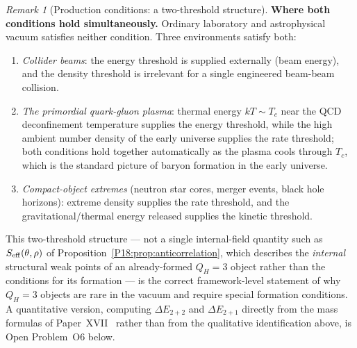 \documentclass[11pt,a4paper]{article}
\theoremstyle{definition}\newtheorem{definition}[theorem]{Definition}
\theoremstyle{remark}
\newtheorem{remark}[theorem]{Remark}
\newcommand{\QH}{Q_H}
\begin{document}
\begin{remark}[Production conditions: a two-threshold structure]
\textbf{Where both conditions hold simultaneously.}  Ordinary
laboratory and astrophysical vacuum satisfies neither condition.
Three environments satisfy both:
\begin{enumerate}[noitemsep,label=(\alph*)]
\item \emph{Collider beams}: the energy threshold is supplied
  externally (beam energy), and the density threshold is irrelevant
  for a single engineered beam-beam collision.
\item \emph{The primordial quark-gluon plasma}: thermal energy
  $kT\sim T_c$ near the QCD deconfinement temperature supplies the
  energy threshold, while the high ambient number density of the
  early universe supplies the rate threshold; both conditions hold
  together automatically as the plasma cools through $T_c$, which is
  the standard picture of baryon formation in the early universe.
\item \emph{Compact-object extremes} (neutron star cores, merger
  events, black hole horizons): extreme density supplies the rate
  threshold, and the gravitational/thermal energy released supplies
  the kinetic threshold.
\end{enumerate}
This two-threshold structure --- not a single internal-field
quantity such as $S_{\rm eff}(\theta,\rho)$ of
Proposition~\ref{P18:prop:anticorrelation}, which describes the
\emph{internal} structural weak points of an already-formed
$\QH=3$ object rather than the conditions for its formation --- is
the correct framework-level statement of why $\QH=3$ objects are
rare in the vacuum and require special formation conditions.  A
quantitative version, computing $\Delta E_{2+2}$ and
$\Delta E_{2+1}$ directly from the mass formulas of
Paper~XVII~\cite{Paper17} rather than from the qualitative
identification above, is Open Problem~O6 below.
\end{remark}
\end{document}
